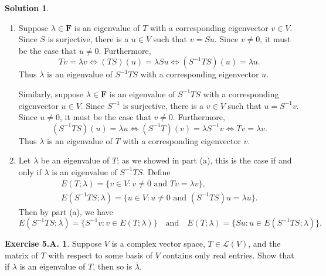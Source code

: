\documentclass[12pt]{article}
\theoremstyle{definition}
\theoremstyle{exercise}
\newtheorem{exercise}{Exercise 5.A.}
\theoremstyle{solution}
\newtheorem*{solution}{Solution}
\newcommand{\lmap}{\mathcal{L}}
\newcommand{\quand}{\quad \text{and} \quad}
\newcommand{\F}{\mathbf{F}}
\begin{document}
\begin{solution}
    \begin{enumerate}
        \item Suppose \( \lambda \in \F \) is an eigenvalue of \( T \) with a corresponding eigenvector \( v \in V \). Since \( S \) is surjective, there is a \( u \in V \) such that \( v = Su \). Since \( v \neq 0 \), it must be the case that \( u \neq 0 \). Furthermore,
        \[
            Tv = \lambda v \iff (TS)(u) = \lambda Su \iff (S^{-1}TS)(u) = \lambda u.
        \]
        Thus \( \lambda \) is an eigenvalue of \( S^{-1}TS \) with a corresponding eigenvector \( u \).

        Similarly, suppose \( \lambda \in \F \) is an eigenvalue of \( S^{-1}TS \) with a corresponding eigenvector \( u \in V \). Since \( S^{-1} \) is surjective, there is a \( v \in V \) such that \( u = S^{-1}v \). Since \( u \neq 0 \), it must be the case that \( v \neq 0 \). Furthermore,
        \[
            (S^{-1}TS)(u) = \lambda u \iff (S^{-1}T)(v) = \lambda S^{-1}v \iff Tv = \lambda v.
        \]
        Thus \( \lambda \) is an eigenvalue of \( T \) with a corresponding eigenvector \( v \).

        \item Let \( \lambda \) be an eigenvalue of \( T \); as we showed in part (a), this is the case if and only if \( \lambda \) is an eigenvalue of \( S^{-1}TS \). Define
        \begin{gather*}
            E(T ; \lambda) = \{ v \in V : v \neq 0 \text{ and } Tv = \lambda v \}, \\[2mm]
            E(S^{-1}TS ; \lambda) = \{ u \in V : u \neq 0 \text{ and } (S^{-1}TS)u = \lambda u \}.
        \end{gather*}
        Then by part (a), we have
        \[
            E(S^{-1}TS ; \lambda) = \{ S^{-1}v : v \in E(T ; \lambda) \} \quand E(T ; \lambda) = \{ Su : u \in E(S^{-1}TS ; \lambda) \}.
        \]
    \end{enumerate}
\end{solution}

\begin{exercise}
\label{ex:16}
    Suppose \( V \) is a complex vector space, \( T \in \lmap(V) \), and the matrix of \( T \) with respect to some basis of \( V \) contains only real entries. Show that if \( \lambda \) is an eigenvalue of \( T \), then so is \( \overline{\lambda} \).
\end{exercise}
\end{document}
